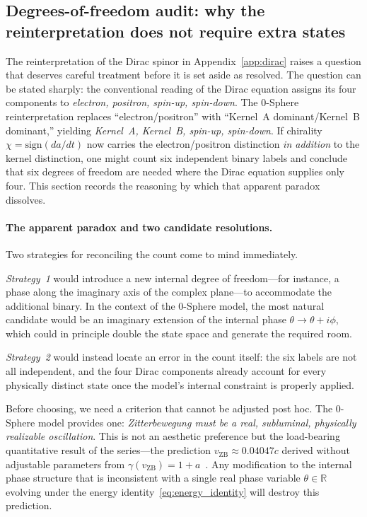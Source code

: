 \documentclass[%
 reprint, amsmath,amssymb, aps, prb, ]{revtex4-2}
\numberwithin{equation}{section}
\newcommand{\iphase}{\theta}
\begin{document}
\subsection{Degrees-of-freedom audit: why the reinterpretation does not require extra states}
\label{subsec:dof_audit}

The reinterpretation of the Dirac spinor in Appendix~\ref{app:dirac} raises a question that deserves careful treatment before it is set aside as resolved. The question can be stated sharply: the conventional reading of the Dirac equation assigns its four components to \emph{electron, positron, spin-up, spin-down}. The 0-Sphere reinterpretation replaces ``electron/positron'' with ``Kernel~A dominant/Kernel~B dominant,'' yielding \emph{Kernel~A, Kernel~B, spin-up, spin-down}. If chirality $\chi = \mathrm{sign}(da/dt)$ now carries the electron/positron distinction \emph{in addition} to the kernel distinction, one might count six independent binary labels and conclude that six degrees of freedom are needed where the Dirac equation supplies only four. This section records the reasoning by which that apparent paradox dissolves.

\paragraph{The apparent paradox and two candidate resolutions.}
Two strategies for reconciling the count come to mind immediately.

\textit{Strategy~1} would introduce a new internal degree of freedom---for instance, a phase along the imaginary axis of the complex plane---to accommodate the additional binary. In the context of the 0-Sphere model, the most natural candidate would be an imaginary extension of the internal phase $\iphase \to \iphase + i\phi$, which could in principle double the state space and generate the required room.

\textit{Strategy~2} would instead locate an error in the count itself: the six labels are not all independent, and the four Dirac components already account for every physically distinct state once the model's internal constraint is properly applied.

Before choosing, we need a criterion that cannot be adjusted post hoc. The 0-Sphere model provides one: \emph{Zitterbewegung must be a real, subluminal, physically realizable oscillation}. This is not an aesthetic preference but the load-bearing quantitative result of the series---the prediction $v_\mathrm{ZB} \approx 0.04047c$ derived without adjustable parameters from $\gamma(v_\mathrm{ZB}) = 1 + a$~\cite{hanamura33, hanamura10}. Any modification to the internal phase structure that is inconsistent with a single real phase variable $\iphase \in \mathbb{R}$ evolving under the energy identity~\eqref{eq:energy_identity} will destroy this prediction.
\end{document}
